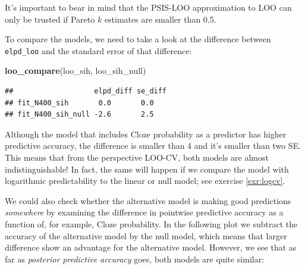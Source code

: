 \documentclass[12pt,]{krantz}
\newenvironment{Shaded}{\begin{snugshade}}{\end{snugshade}}
\newcommand{\DataTypeTok}[1]{\textcolor[rgb]{0.13,0.29,0.53}{#1}}
\newcommand{\DecValTok}[1]{\textcolor[rgb]{0.00,0.00,0.81}{#1}}
\newcommand{\FloatTok}[1]{\textcolor[rgb]{0.00,0.00,0.81}{#1}}
\newcommand{\KeywordTok}[1]{\textcolor[rgb]{0.13,0.29,0.53}{\textbf{#1}}}
\newcommand{\NormalTok}[1]{#1}
\newcommand{\OperatorTok}[1]{\textcolor[rgb]{0.81,0.36,0.00}{\textbf{#1}}}
\newcommand{\StringTok}[1]{\textcolor[rgb]{0.31,0.60,0.02}{#1}}
\theoremstyle{definition}
\theoremstyle{definition}
\theoremstyle{definition}
\theoremstyle{remark}
\begin{document}
It's important to bear in mind that the PSIS-LOO approximation to LOO can only be trusted if Pareto \(k\) estimates are smaller than 0.5.

To compare the models, we need to take a look at the difference between \texttt{elpd\_loo} and the standard error of that difference:

\begin{Shaded}
\begin{Highlighting}[]
\KeywordTok{loo_compare}\NormalTok{(loo_sih, loo_sih_null)}
\end{Highlighting}
\end{Shaded}

\begin{verbatim}
##                   elpd_diff se_diff
## fit_N400_sih       0.0       0.0   
## fit_N400_sih_null -2.6       2.5
\end{verbatim}

Although the model that includes Cloze probability as a predictor has higher predictive accuracy, the difference is smaller than 4 and it's smaller than two SE. This means that from the perspective LOO-CV, both models are almost indistinguishable! In fact, the same will happen if we compare the model with logarithmic predictability to the linear or null model; see exercise \ref{exr:logcv}.

We could also check whether the alternative model is making good predictions \emph{somewhere} by examining the difference in pointwise predictive accuracy as a function of, for example, Cloze probability. In the following plot we subtract the accuracy of the alternative model by the null model, which means that larger difference show an advantage for the alternative model. However, we see that as far as \emph{posterior predictive accuracy} goes, both models are quite similar:

\begin{Shaded}
\end{Shaded}
\end{document}
